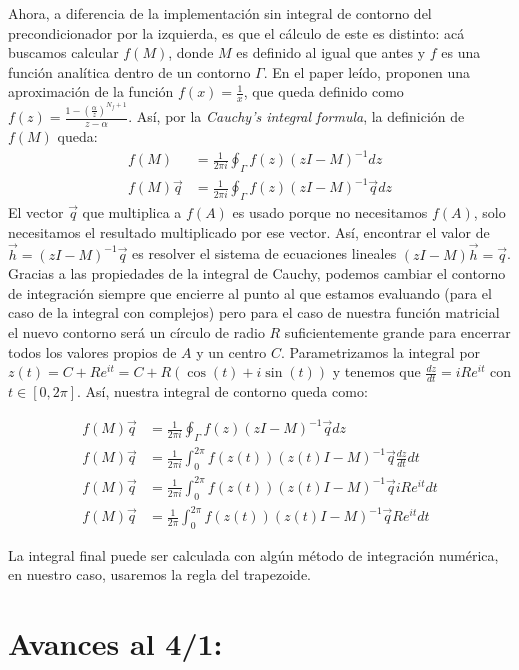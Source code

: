 \documentclass[fleqn]{article}
\begin{document}
Ahora, a diferencia de la implementación sin integral de contorno del precondicionador por la izquierda, es que el cálculo de este es distinto: acá buscamos calcular $f(M)$, donde $M$ es definido al igual que antes y $f$ es una función analítica dentro de un contorno $\Gamma$. En el paper leído, proponen una aproximación de la función $f(x) = \displaystyle{\frac{1}{x}}$, que queda definido como $f(z) = \displaystyle{\frac{1 - (\frac{\alpha}{z})^{N_f + 1}}{z - \alpha}}$. Así, por la \textit{Cauchy's integral formula}, la definición de $f(M)$ queda:
\begin{align*}
    f(M) &= \frac{1}{2\pi i} \oint_{\Gamma} f(z)(zI - M)^{-1}dz \\
    f(M)\vec{q} &= \frac{1}{2\pi i} \oint_{\Gamma} f(z)(zI - M)^{-1}\vec{q}dz
\end{align*}
\newpage
El vector $\vec{q}$ que multiplica a $f(A)$ es usado porque no necesitamos $f(A)$, solo necesitamos el resultado multiplicado por ese vector. Así, encontrar el valor de $\vec{h} = (zI - M)^{-1}\vec{q}$ es resolver el sistema de ecuaciones lineales $(zI - M)\vec{h} = \vec{q}$. Gracias a las propiedades de la integral de Cauchy, podemos cambiar el contorno de integración siempre que encierre al punto al que estamos evaluando (para el caso de la integral con complejos) pero para el caso de nuestra función matricial el nuevo contorno será un círculo de radio $R$ suficientemente grande para encerrar todos los valores propios de $A$ y un centro $C$. Parametrizamos la integral por $z(t) = C + Re^{it} = C + R(\cos(t) + i\sin(t))$ y tenemos que $\frac{dz}{dt} = iRe^{it}$ con $t \in [0,2\pi]$. Así, nuestra integral de contorno queda como:

\begin{align*}
    f(M)\vec{q} &= \frac{1}{2\pi i} \oint_{\Gamma} f(z)(zI - M)^{-1}\vec{q}dz \\
    f(M)\vec{q} &= \frac{1}{2\pi i} \int_{0}^{2\pi} f(z(t))(z(t)I - M)^{-1}\vec{q}\frac{dz}{dt}dt \\
    f(M)\vec{q} &= \frac{1}{2\pi i} \int_{0}^{2\pi} f(z(t))(z(t)I - M)^{-1}\vec{q}iRe^{it}dt \\
    f(M)\vec{q} &= \frac{1}{2\pi} \int_{0}^{2\pi} f(z(t))(z(t)I - M)^{-1}\vec{q}Re^{it}dt
\end{align*}

La integral final puede ser calculada con algún método de integración numérica, en nuestro caso, usaremos la regla del trapezoide.

\newpage
\section{Avances al 4/1:}
\end{document}
